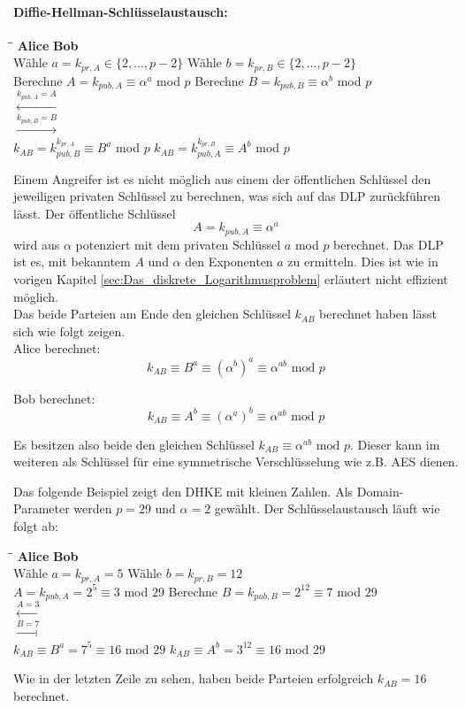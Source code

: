\paragraph{Diffie-Hellman-Schlüsselaustausch:}
\begin{tabbing}
\qquad \qquad \qquad \qquad \qquad \qquad \qquad \qquad \= \qquad \qquad \qquad \= \qquad \qquad \qquad \qquad \qquad \qquad \qquad \qquad \kill
\textbf{Alice} \> \> \textbf{Bob}\\
Wähle $a=k_{pr,A} \in \{2,..., p-2\}$ \> \> Wähle $b=k_{pr,B} \in \{2,..., p-2\}$\\
Berechne $A = k_{pub,A} \equiv \alpha ^a$ mod $p$ \> \> Berechne $B = k_{pub,B} \equiv \alpha ^b$ mod $p$\\
\> $\xleftarrow{k_{pub,A} = A}$ \> \\
\> $\xrightarrow{k_{pub,B} = B}$ \> \\
$k_{AB} = k_{pub,B}^{k_{pr,A}} \equiv B^a$ mod $p$ \> \> $k_{AB} = k_{pub,A}^{k_{pr,B}} \equiv A^b$ mod $p$
\end{tabbing}

Einem Angreifer ist es nicht möglich aus einem der öffentlichen Schlüssel den jeweiligen privaten Schlüssel zu berechnen, was sich auf das DLP zurückführen lässt. Der öffentliche Schlüssel $$A = k_{pub,A} \equiv \alpha ^a$$ wird aus $\alpha$ potenziert mit dem privaten Schlüssel $a$ mod $p$ berechnet. Das DLP ist es, mit bekanntem $A$ und $\alpha$ den Exponenten $a$ zu ermitteln. Dies ist wie in vorigen Kapitel \ref{sec:Das_diskrete_Logarithmusproblem} erläutert nicht effizient möglich.\\

Das beide Parteien am Ende den gleichen Schlüssel $k_{AB}$ berechnet haben lässt sich wie folgt zeigen.\\

Alice berechnet:
$$k_{AB} \equiv B^a \equiv (\alpha ^b)^a \equiv \alpha^{ab} \text{ mod } p$$

Bob berechnet:
$$k_{AB} \equiv A^b \equiv (\alpha ^a)^b \equiv \alpha^{ab} \text{ mod } p$$

Es besitzen also beide den gleichen Schlüssel $k_{AB} \equiv \alpha^{ab} \text{ mod } p$. Dieser kann im weiteren als Schlüssel für eine symmetrische Verschlüsselung wie z.B. AES dienen.

Das folgende Beispiel zeigt den DHKE mit kleinen Zahlen. Als Domain-Parameter werden $p=29$ und $\alpha = 2$ gewählt. Der Schlüsselaustausch läuft wie folgt ab:
\begin{tabbing}
\qquad \qquad \qquad \qquad \qquad \qquad \qquad \qquad \= \qquad \qquad \qquad \= \qquad \qquad \qquad \qquad \qquad \qquad \qquad \qquad \kill
\textbf{Alice} \> \> \textbf{Bob}\\
Wähle $a=k_{pr,A} = 5$ \> \> Wähle $b=k_{pr,B} = 12$\\
$A = k_{pub,A} = 2^5 \equiv 3$ mod $29$ \> \> Berechne $B = k_{pub,B} = 2^{12} \equiv 7$ mod $29$\\
\> $\xleftarrow{A = 3}$ \> \\
\> $\xrightarrow{B = 7}$ \> \\
$k_{AB} \equiv B^a = 7^5 \equiv 16$ mod $29$ \> \> $k_{AB} \equiv A^b = 3^{12} \equiv 16$ mod $29$
\end{tabbing}

Wie in der letzten Zeile zu sehen, haben beide Parteien erfolgreich $k_{AB} = 16$ berechnet.\cite{Paar.2016}